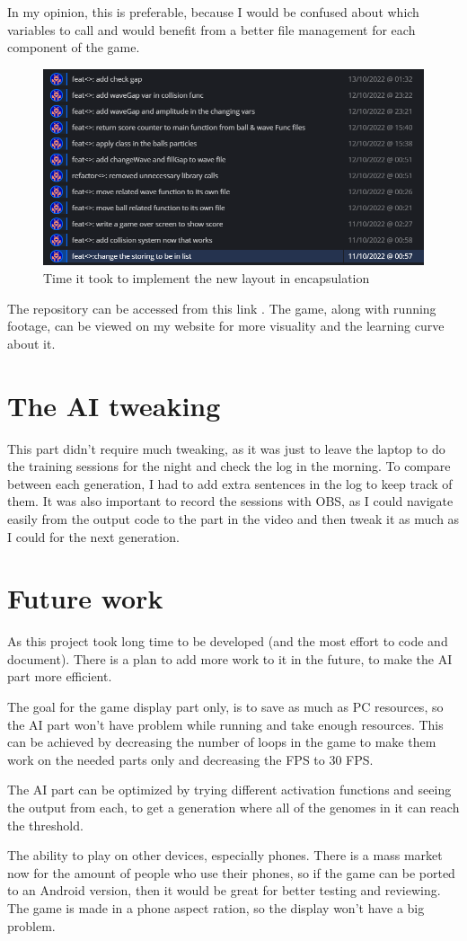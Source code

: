 In my opinion, this is preferable, because I would be confused about which variables to call and would benefit from a better file management for each component of the game.
\begin{figure}[H]
	\centering
	\includegraphics[width=0.7\linewidth]{usedImages/repoEncapsulation}
	\caption[]{Time it took to implement the new layout in encapsulation}
	\label{fig:repoencapsulation}
\end{figure}

The repository can be accessed from this link . The game, along with running footage, can be viewed on my website  for more visuality and the learning curve about it.

\section{The AI tweaking}

This part didn't require much tweaking, as it was just to leave the laptop to do the training sessions for the night and check the log in the morning. To compare between each generation, I had to add extra  sentences in the log to keep track of them. It was also important to record the sessions with OBS, as I could navigate easily from the output code to the part in the video and then tweak it as much as I could for the next generation.

\section{Future work}
As this project took long time to be developed (and the most effort to code and document). There is a plan to add more work to it in the future, to make the AI part more efficient.

The goal for the game display part only, is to save as much as PC resources, so the AI part won't have problem while running and take enough resources. This can be achieved by decreasing the number of loops in the game to make them work on the needed parts only and decreasing the FPS to 30 FPS.

The AI part can be optimized by trying different activation functions and seeing the output from each, to get a generation where all of the genomes in it can reach the threshold.

The ability to play on other devices, especially phones. There is a mass market now for the amount of people who use their phones, so if the game can be ported to an Android version, then it would be great for better testing and reviewing. The game is made in a phone aspect ration, so the display won't have a big problem. 
